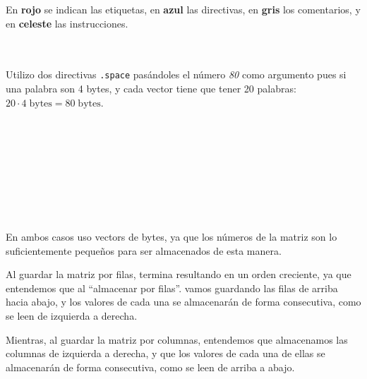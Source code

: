\documentclass[a4paper]{report}
\begin{document}
En \textcolor{autumn-red-pyg}{\textbf{rojo}} se indican las etiquetas, en \textcolor{autumn-blue-pyg}{\textbf{azul}} las directivas, en \textcolor{autumn-gray-pyg}{\textbf{gris}} los comentarios, y en \textcolor{autumn-teal-pyg}{\textbf{celeste}} las instrucciones.

\section{}

\inputminted{mips}{src/problemas/2.asm}

Utilizo dos directivas \texttt{.space} pasándoles el número \textit{80} como argumento pues si una palabra son 4 bytes, y cada vector tiene que tener 20 palabras: $20 \cdot 4\;\text{bytes} = 80\;\text{bytes}$.

\section{}

\inputminted{mips}{src/problemas/3.asm}


\section{}

\inputminted{mips}{src/problemas/4.asm}


\section{}

\inputminted[breaklines, breakbytokenanywhere]{mips}{src/problemas/5.asm}


\section{}

\inputminted{mips}{src/problemas/6.asm}

En ambos casos uso vectors de bytes, ya que los números de la matriz son lo suficientemente pequeños para ser almacenados de esta manera.

Al guardar la matriz por filas, termina resultando en un orden creciente, ya que entendemos que al ``almacenar por filas''. vamos guardando las filas de arriba hacia abajo, y los valores de cada una se almacenarán de forma consecutiva, como se leen de izquierda a derecha.

Mientras, al guardar la matriz por columnas, entendemos que almacenamos las columnas de izquierda a derecha, y que los valores de cada una de ellas se almacenarán de forma consecutiva, como se leen de arriba a abajo.
\end{document}
